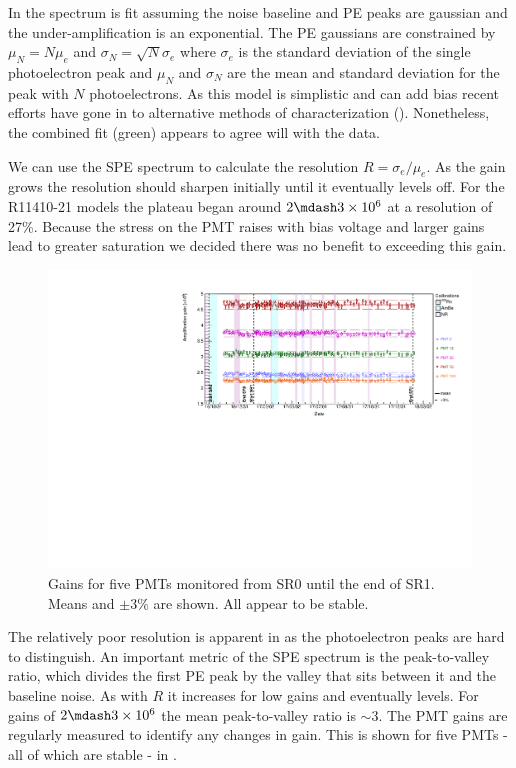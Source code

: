 In  the spectrum is fit assuming the noise baseline and PE peaks are gaussian and the under-amplification is
an exponential.  The PE gaussians are constrained by $\mu_{N} = N \mu_{e}$ and $\sigma_{N} = \sqrt{N} \sigma_{e}$ where $\sigma_{e}$ is the
standard deviation of the single photoelectron peak and $\mu_{N}$ and $\sigma_{N}$ are the mean and standard deviation for the peak with
$N$ photoelectrons.  As this model is simplistic and can add bias recent efforts have gone in to alternative methods
of characterization ().  Nonetheless, the combined fit (green) appears to agree will with the data.

We can use the SPE spectrum to calculate the resolution $R = \sigma_{e} / \mu_{e}$.  As the gain grows the resolution should sharpen
initially until it eventually levels off.  For the R11410-21 models the plateau began around $2 \mdash 3 \times 10^{6}$ at a resolution of
27\%.  Because the stress on the PMT raises with bias voltage and larger gains lead to greater saturation we decided there was no benefit
to exceeding this gain.

\begin{figure}
\centering
\includegraphics[width=\textwidth]{PMTGainStability}
\caption{Gains for five PMTs monitored from SR0 until the end of SR1.  Means and $\pm 3\%$ are shown.  All appear to be stable.}
\label{fig:xenon1t_pmt_time}
\end{figure}

The relatively poor resolution is apparent in  as the photoelectron peaks are hard to distinguish.  An
important metric of the SPE spectrum is the peak-to-valley ratio, which divides the first PE peak by the valley that sits between it and
the baseline noise.  As with $R$ it increases for low gains and eventually levels.  For gains of $2 \mdash 3 \times 10^{6}$ the mean
peak-to-valley ratio is ${\sim} 3$.  The PMT gains are regularly measured to identify any changes in gain.  This is shown for five
PMTs - all of which are stable - in .



